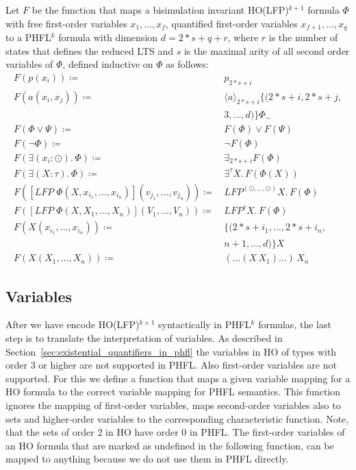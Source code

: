 \begin{definition}
    \label{definition:lower_bounds_phfl_formula_function}
        
    Let $F$ be the function that maps a bisimulation invariant HO(LFP)$^{k+1}$ formula $\Phi$ with free first-order variables $x_1, \dots, x_f$, quantified first-order variables $x_{f+1}, \dots,
    x_q$ to a PHFL$^k$ formula with dimension $d = 2 * s + q + r$, where $r$ is the number of states that defines the reduced LTS and $s$ is the maximal arity
    of all second order variables of $\Phi$, defined
    inductive on $\Phi$ as follows:
    \begin{align*}
        F(p(x_i)) \coloneqq &\, p_{2*s+i} \\
        F(a(x_i, x_j)) \coloneqq &\, \langle a \rangle_{2*s+i} \{(2*s+i, 2*s+j, \\
        &\,3, \dots, d)\} \Phi_\sim \\
        F(\Phi \vee \Psi) \coloneqq &\, F(\Phi) \vee F(\Psi) \\
        F(\neg \Phi) \coloneqq &\, \neg F(\Phi) \\
        F(\exists (x_i \colon \odot).\,\Phi) \coloneqq &\, \exists_{2*s+i} F(\Phi) \\
        F(\exists (X \colon \tau).\,\Phi) \coloneqq &\, \exists^\tau X.\,F(\Phi(X)) \\
        F([LFP\;\Phi(X, x_{i_1}, \dots, x_{i_n})](v_{j_1}, \dots, v_{j_n})) \coloneqq &\,LFP^{(\odot, \dots, \odot)} X.\, F(\Phi) \\
        F([LFP\;\Phi(X, X_1, \dots, X_n)](V_1, \dots, V_n)) \coloneqq &\,LFP^\tau X.\, F(\Phi) \\
        F(X(x_{i_1}, \dots, x_{i_n})) \coloneqq &\, \{(2*s+i_1, \dots, 2*s+i_n, \\
        &\,n + 1, \dots, d)\}X\\
        F(X(X_1, \dots, X_n)) \coloneqq &\, (\dots (X\,X_1)\dots)\,X_n
    \end{align*}
\end{definition}

\subsection{Variables}\label{subsec:lower_bounds_variables}

After we have encode HO(LFP)$^{k+1}$ syntactically in PHFL$^k$ formulas, the last step is to translate the 
interpretation of variables. As described in Section~\ref{sec:existential_quantifiers_in_phfl} the variables in HO of 
types with order $3$ or higher are not supported in PHFL. Also first-order variables are not supported. For this we 
define a function that maps a given variable mapping for a HO formula to the correct variable mapping for PHFL 
semantics. This function ignores the mapping of first-order variables, maps second-order variables also to sets and 
higher-order variables to the corresponding characteristic function. Note, that the sets of order $2$ in HO have order 
$0$ in PHFL. The first-order variables of an HO formula that are marked as undefined in the following function, can be 
mapped to anything because we do not use them in PHFL directly.

